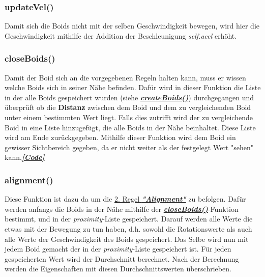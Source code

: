 \documentclass[a4paper, hidelinks, 12pt]{article}
\begin{document}
\subsubsection{updateVel()}\label{UmsetzungupdateVel}
Damit sich die Boids nicht mit der selben Geschwindigkeit bewegen, wird hier die Geschwindigkeit mithilfe der Addition der Beschleunigung \emph{self.acel} erhöht.
\newline
		
\subsubsection{closeBoids()}\label{UmsetzungcloseBoids}
Damit der Boid sich an die vorgegebenen Regeln halten kann, muss er wissen welche Boids sich in seiner Nähe befinden. Dafür wird in dieser Funktion die Liste in der alle Boids gespeichert wurden (siehe \hyperref[UmsetzungcreateBoids]{\emph{\textbf{createBoids()}}}) durchgegangen und überprüft ob die \textbf{Distanz}\cite{distance} zwischen dem Boid und dem zu vergleichenden Boid unter einem bestimmten Wert liegt. Falls dies zutrifft wird der zu vergleichende Boid in eine Liste hinzugefügt, die alle Boids in der Nähe beinhaltet. Diese Liste wird am Ende zurückgegeben. Mithilfe dieser Funktion wird dem Boid ein gewisser Sichtbereich gegeben, da er nicht weiter als der festgelegt Wert "sehen" kann.\hyperref[CodecloseBoids]{\textbf{\emph{[Code]}}}
\newline
		
\subsubsection{alignment()}\label{Umsetzungalignment}
Diese Funktion ist dazu da um die \hyperref[IdeeAlignment]{2. Regel \textbf{\emph{"Alignment"}}} zu befolgen. Dafür werden anfangs die Boids in der Nähe mithilfe der \hyperref[UmsetzungcloseBoids]{\emph{\textbf{closeBoids()}}}-Funktion bestimmt, und in der \emph{proximity}-Liste gespeichert. Darauf werden alle Werte die etwas mit der Bewegung zu tun haben, d.h. sowohl die Rotationswerte als auch alle Werte der Geschwindigkeit des Boids gespeichert. Das Selbe wird nun mit jedem Boid gemacht der in der \emph{proximity}-Liste gespeichert ist. Für jeden gespeicherten Wert wird der Durchschnitt berechnet. Nach der Berechnung werden die Eigenschaften mit diesen Durchschnittswerten überschrieben.
\newline\newline
\end{document}
